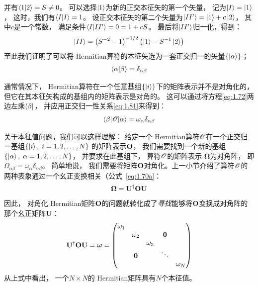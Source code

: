 \begin{enumerate}[]
 并有$\langle 1 \vert 2 \rangle = S \neq 0$。
 可以选择$\Ket{1}$为新的正交本征矢的第一个矢量，
 记为$\Ket{I} = \Ket{1}$，
 这时，我们有$\langle I \vert I \rangle = 1$。
 设正交本征矢的第二个矢量为$\Ket{II^\prime} = \Ket{1} + c\Ket{2}$，
 其中$c$是一个常数，
 满足条件$\langle I \vert II^\prime \rangle = 0 = 1+cS$。
 最后将$\Ket{II^\prime}$归一化，得到：
 \begin{equation}
     \Ket{II} = \left(S^{-2}-1\right)^{-1/2}\left(\Ket{1}-S^{-1}\Ket{2}\right)
     \label{eq:1.80}
 \end{equation}
 至此我们证明了可以将 Hermitian算符的本征矢选为一套正交归一的矢量$\left\{ \Ket{\alpha} \right\}$；
 \begin{equation}
     \langle \alpha \vert \beta \rangle = \delta_{\alpha\beta}
     \label{eq:1.81}
 \end{equation}
\end{enumerate}

通常情况下，
Hermitian算符在一个任意基组$\left\{ \Ket{i} \right\}$下的矩阵表示并不是对角化的，
但它在其本征矢构成的基组内的矩阵表示是对角的。
这可以通过将方程\eqref{eq:1.72}两边左乘$\Bra{\beta}$，
并应用正交归一性关系\eqref{eq:1.81}来得到：
\begin{equation}
 \left\langle \beta\middle\vert \mathscr{O} \middle\vert \alpha\right\rangle = \omega_\alpha\delta_{\alpha\beta}
 \label{eq:1.82}
\end{equation}

关于本征值问题，我们可以这样理解：
给定一个 Hermitian算符$\mathscr{O}$在一个正交归一基组$\left\{\Ket{i},\; i = 1, 2, \dots, N\right\}$ 的矩阵表示$\mathbf O$，
我们需要找到一个新的基组 $\left\{\Ket{\alpha},\; \alpha = 1, 2, \dots, N\right\}$，
并要求在此基组下，
算符$\mathscr{O}$的矩阵表示 $\boldsymbol\Omega$为对角阵，
即$\Omega_{\alpha\beta} = \omega_\alpha\delta_{\alpha\beta}$。
简单地说，
我们需要将矩阵$\mathbf O$对角化。上一小节介绍了算符$\mathscr{O}$的两种表象通过一个幺正变换相关（公式~\ref{eq:1.70a}：
\[\boldsymbol\Omega = \mathbf U^\dagger\mathbf{O}\mathbf{U}\]
因此，
对角化 Hermitian矩阵$\mathbf O$的问题就转化成了\emph{寻找}能够将$\mathbf O$变换成对角阵的那个幺正矩阵$\mathbf{U}$：
\begin{equation}
 \mathbf U^\dagger\mathbf{O}\mathbf{U} = \boldsymbol\omega = \begin{pmatrix}
     \omega_1     & & & &\\
          &\omega_2 &     &\mathbf{0} &\\
          & &\omega_3 & &\\
          &\mathbf{0} & & \ddots & \\
          & &     & &\omega_N
 \end{pmatrix}
 \label{eq:1.83}
\end{equation}
从上式中看出，
一个$N\times N$的 Hermitian矩阵具有$N$个本征值。

